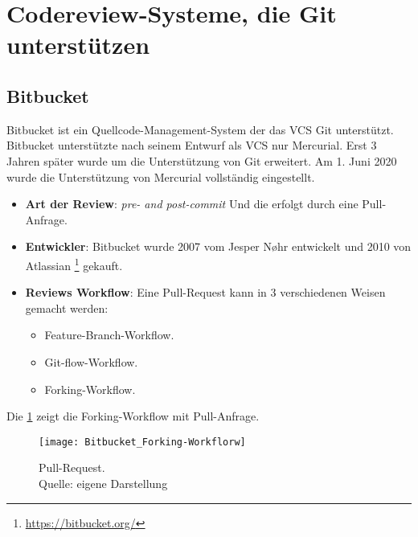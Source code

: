 \blindtext
\blindtext

\section{Codereview-Systeme, die Git unterstützen}
\label{sec:CRS-Git}

\subsection{Bitbucket}
\label{subsec:Bitbucket}

Bitbucket ist ein Quellcode-Management-System der das \ac{VCS} Git unterstützt. Bitbucket unterstützte nach seinem Entwurf als \ac{VCS} nur Mercurial. Erst 3 Jahren später wurde um die Unterstützung von Git erweitert. Am 1. Juni 2020 wurde die Unterstützung von Mercurial vollständig eingestellt.

\begin{itemize}
	\item \textbf{Art der Review}: \textit{pre- and post-commit} Und die erfolgt durch eine Pull-Anfrage.
	\item \textbf{Entwickler}: Bitbucket wurde 2007 vom Jesper Nøhr entwickelt und 2010 von Atlassian \footnote{\url{https://bitbucket.org/}}
		 gekauft. 
	\item \textbf{Reviews Workflow}: Eine Pull-Request kann in 3 verschiedenen Weisen gemacht werden:
		\begin{itemize}
			\item Feature-Branch-Workflow.
			\item Git-flow-Workflow.
			\item Forking-Workflow.
		\end{itemize}
\end{itemize}

Die \cref{fig:Forking-workflow} zeigt die Forking-Workflow mit Pull-Anfrage.

\begin{figure}[H]
	\centering
	\texttt{[image: Bitbucket\_Forking-Workflorw]}
	\caption[Bitbuckets Ablauf]{Pull-Request.\\ Quelle: eigene Darstellung}
	\label{fig:Forking-workflow}
\end{figure}		  

